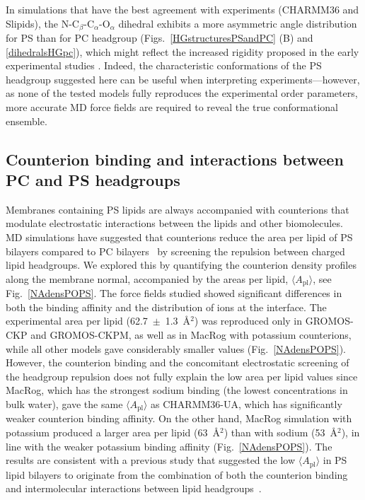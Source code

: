 \documentclass[journal=jpcbfk,manuscript=article]{achemso}
\begin{document}
In simulations that have the best agreement with experiments (CHARMM36 and Slipids),
the N-C$_\beta$-C$_\alpha$-O$_\alpha$ dihedral exhibits a more asymmetric
angle distribution for PS than for PC headgroup (Figs.~\ref{HGstructuresPSandPC} (B) and \ref{dihedralsHGpc}),
which might reflect the increased rigidity proposed in the early experimental studies \cite{browning80,buldt81}.
Indeed, the characteristic conformations of the PS headgroup suggested here can be useful when interpreting experiments---however,
as none of the tested models fully reproduces the experimental order parameters, more accurate MD force fields are required to reveal the true conformational ensemble.

\subsection{Counterion binding and interactions between PC and PS headgroups}\label{ciBINDINGsection}

Membranes containing PS lipids are always accompanied with counterions that
modulate electrostatic interactions between the lipids and other biomolecules. MD simulations have suggested
that counterions reduce the area per lipid of PS bilayers compared to PC
bilayers~\cite{pandit02,mukhopadhyay04,pedersen06} by screening the repulsion between charged lipid headgroups.
We explored this by quantifying the counterion density profiles along the membrane normal, accompanied by the areas per lipid, $\langle A_\mathrm{pl} \rangle$, see Fig.~\ref{NAdensPOPS}.
The force fields studied showed significant differences in both the binding affinity
and the distribution of ions at the interface.
The experimental area per lipid (62.7~$\pm$~1.3~\AA$^2$) \cite{pan14} 
was reproduced only in GROMOS-CKP and GROMOS-CKPM, as well as in MacRog
with potassium counterions, while all other models gave considerably smaller values (Fig.~\ref{NAdensPOPS}).
However, the counterion binding and the concomitant electrostatic screening of the headgroup
repulsion does not fully explain the low area per lipid values
since MacRog, which has the strongest sodium binding
(the lowest concentrations in bulk water), gave the same $\langle A_\mathrm{pl} \rangle$
as CHARMM36-UA, which has significantly weaker counterion binding
affinity. On the other hand, MacRog simulation with potassium produced a larger area per lipid (63~\AA$^2$) than
with sodium (53~\AA$^2$), in line with the weaker potassium binding affinity (Fig.~\ref{NAdensPOPS}).
The results are consistent with a previous study that suggested the
low $\langle A_\mathrm{pl} \rangle$ in PS lipid bilayers to originate from the combination
of both the counterion binding and intermolecular interactions between lipid headgroups~\cite{petrache04}.
\end{document}
